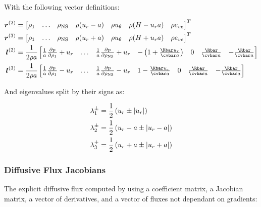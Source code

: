 \documentclass[10pt]{article}
\begin{document}
\begin{flushleft}
With the following vector definitions:

\begin{equation}
\begin{aligned}
 \boldsymbol{r}^{(2)} &= \begin{bmatrix} \rho_1 & \dots & \rho_\text{NS} & \rho (u_r - a) & \rho u_\theta & \rho (H - u_r a) & \rho e_{ve} \end{bmatrix} ^T \\
 \boldsymbol{r}^{(3)} &= \begin{bmatrix} \rho_1 & \dots & \rho_\text{NS} & \rho (u_r + a) & \rho u_\theta & \rho (H + u_r a) & \rho e_{ve} \end{bmatrix} ^T \\
 \boldsymbol{l}^{(2)} &= \frac{1}{2 \rho a} \begin{bmatrix} \frac{1}{a} \pd{p}{\rho_1} + u_r & \dots & \frac{1}{a} \pd{p}{\rho_\text{NS}} + u_r & -\bp{1 + \frac{\Rbar u_r }{\cvbar a}} & 0 & \frac{\Rbar}{\cvbar a} & - \frac{\Rbar}{\cvbar a} \end{bmatrix} \\
 \boldsymbol{l}^{(3)} &= \frac{1}{2 \rho a} \begin{bmatrix} \frac{1}{a} \pd{p}{\rho_1} - u_r & \dots & \frac{1}{a} \pd{p}{\rho_\text{NS}} - u_r & 1 - \frac{\Rbar u_r}{\cvbar a} & 0 & \frac{\Rbar}{\cvbar a} & - \frac{\Rbar}{\cvbar a} \end{bmatrix}
\end{aligned}
\end{equation}

And eigenvalues split by their signs as:

\begin{equation}
\begin{aligned}
\lambda_1^\pm &= \frac{1}{2} \left( u_r \pm |u_r| \right) \\
\lambda_2^\pm &= \frac{1}{2} \left( u_r - a \pm |u_r - a| \right) \\
\lambda_3^\pm &= \frac{1}{2} \left( u_r + a \pm |u_r + a| \right)
\end{aligned}
\end{equation}

\subsubsection{Diffusive Flux Jacobians}

The explicit diffusive flux computed by using a coefficient matrix, a Jacobian matrix, a vector of derivatives, and a vector of fluxes not dependant on gradients:


\end{flushleft}
\end{document}
